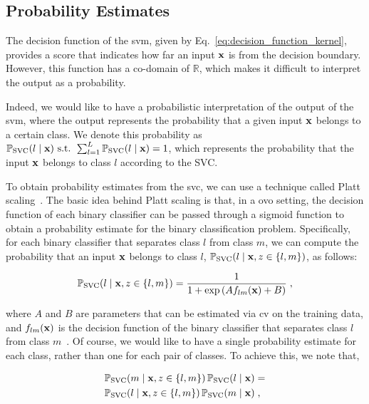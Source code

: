 \subsection{Probability Estimates}
\label{sec:ntools:svm:probability}

The decision function of the \gls{svm}, given by Eq.~\eqref{eq:decision_function_kernel}, provides a score that indicates how far an input $\mathbf{x}$ is from the decision boundary. However, this function has a co-domain of $\mathbb{R}$, which makes it difficult to interpret the output as a probability. 

\smallskip
Indeed, we would like to have a probabilistic interpretation of the output of the \gls{svm}, where the output represents the probability that a given input $\mathbf{x}$ belongs to a certain class. We denote this probability as $\mathbb{P}_{\mathrm{SVC}}(l \mid \mathbf{x}) \text{ s.t. } \sum_{l=1}^L \mathbb{P}_{\mathrm{SVC}}(l \mid \mathbf{x}) = 1$, which represents the probability that the input $\mathbf{x}$ belongs to class $l$ according to the SVC.

\smallskip
To obtain probability estimates from the \gls{svc}, we can use a technique called Platt scaling~\cite{platt_2000,lin_2003}. The basic idea behind Platt scaling is that, in a \gls{ovo} setting, the decision function of each binary classifier can be passed through a sigmoid function to obtain a probability estimate for the binary classification problem. Specifically, for each binary classifier that separates class $l$ from class $m$, we can compute the probability that an input $\mathbf{x}$ belongs to class $l$, $\mathbb{P}_{\mathrm{SVC}}(l \mid \mathbf{x}, z \in \{l, m\})$, as follows:

\begin{equation}
  \mathbb{P}_{\mathrm{SVC}}(l \mid \mathbf{x}, z \in \{l, m\}) = \frac{1}{1 + \exp{(A f_{lm}(\mathbf{x}) + B)}}\;,
\end{equation}

where $A$ and $B$ are parameters that can be estimated via \gls{cv} on the training data, and $f_{lm}(\mathbf{x})$ is the decision function of the binary classifier that separates class $l$ from class $m$~\cite{libsvm}. Of course, we would like to have a single probability estimate for each class, rather than one for each pair of classes. To achieve this, we note that,

\begin{equation}
\begin{split}
  &\mathbb{P}_{\mathrm{SVC}}(m \mid \mathbf{x}, z \in \{l, m\}) \, \mathbb{P}_{\mathrm{SVC}}(l \mid \mathbf{x}) = \\
  &\mathbb{P}_{\mathrm{SVC}}(l \mid \mathbf{x}, z \in \{l, m\}) \, \mathbb{P}_{\mathrm{SVC}}(m \mid \mathbf{x})\;,
\end{split}
\end{equation}

